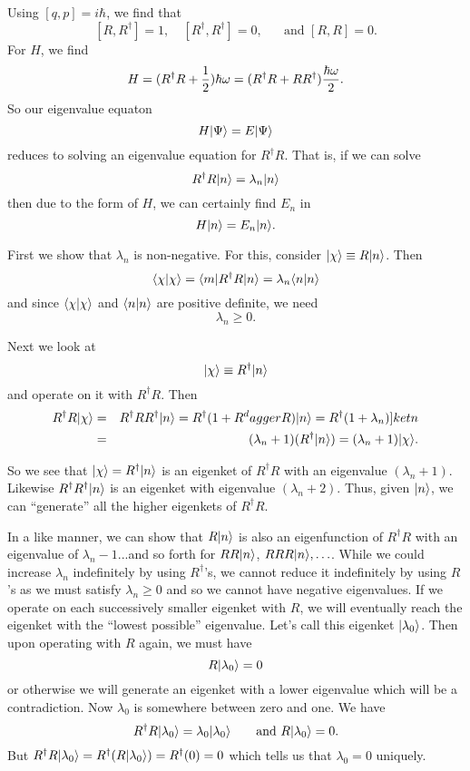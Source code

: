 Using $[q,p] = i\hbar$, we find that 
$$[R,R^\dagger] = 1, \quad [R^\dagger, R^\dagger] = 0, \mbox{~~~~~and } [R,R] = 0.$$
For $H$, we find 
$$H = (R^\dagger R + {1\over2})\hbar\omega = (R^\dagger R + RR^\dagger){\hbar\omega\over2}.$$
So our eigenvalue equaton
$$H|\Psi\rangle = E|\Psi\rangle$$ reduces to solving an eigenvalue equation for
$R^\dagger R$. That is, if we can solve 
$$R^\dagger R |n\rangle = \lambda_n |n\rangle$$ then due to the form of $H$, we can certainly find $E_n$ in 
$$H|n\rangle = E_n |n\rangle.$$ 

First we show that $\lambda_n$ is non-negative. For this, consider $|\chi\rangle \equiv R|n\rangle$. Then 
$$\langle \chi|\chi\rangle = \langle m| R ^\dagger R| n \rangle  = \lambda_n\langle n|n\rangle$$ and since $\langle \chi|\chi\rangle$ and $\langle n|n\rangle$ are positive definite, we need
$$\lambda_n \ge 0.$$

Next we look at
$$|\chi\rangle \equiv R^\dagger |n\rangle$$ and operate on it with $R^\dagger R$. Then
\begin{eqnarray*}
R^\dagger R|\chi\rangle &=& R^\dagger R R^\dagger|n\rangle = R^\dagger(1+ R^dagger R)|n\rangle = R^\dagger(1+\lambda_n)]ket{n}\\
                                    &=& (\lambda_n + 1)(R^\dagger|n\rangle) = (\lambda_n + 1) |\chi\rangle.
\end{eqnarray*}

So we see that $|\chi\rangle = R^\dagger |n\rangle$ is an eigenket of $R^\dagger R$ with an eigenvalue $(\lambda_n + 1)$. Likewise $R^\dagger R^\dagger |n\rangle$ is an eigenket with 
eigenvalue $(\lambda_n+2)$. Thus, given $|n\rangle$, we can ``generate'' all the higher eigenkets of $R^\dagger R$.

In a like manner, we can show that $R|n\rangle$ is also an eigenfunction of $R^\dagger R$ with an eigenvalue of $\lambda_n-1$...and so forth for $RR|n\rangle$, $RRR|n\rangle, \hdots$. 
While we could increase $\lambda_n$ indefinitely by using $R^\dagger$'s, we cannot reduce it indefinitely by using $R$'s as we must satisfy $\lambda_n \ge 0$ and so we cannot have
negative eigenvalues. If we operate on each successively smaller eigenket with $R$, we will eventually reach the eigenket with the ``lowest possible'' eigenvalue. 
Let's call this eigenket $|\lambda_0\rangle$. Then upon operating with $R$ again, we must have
$$R|\lambda_0\rangle = 0$$ or otherwise we will generate an eigenket with a lower eigenvalue which will be a contradiction. Now $\lambda_0$ is somewhere between zero and one. We have
$$R^\dagger R|\lambda_0\rangle = \lambda_0|\lambda_0\rangle \mbox{~~~~~ and } R|\lambda_0\rangle = 0.$$
But $R^\dagger R|\lambda_0\rangle = R^\dagger (R|\lambda_0\rangle) = R^\dagger (0) = 0$ which tells us that $\lambda_0 = 0$ uniquely.

